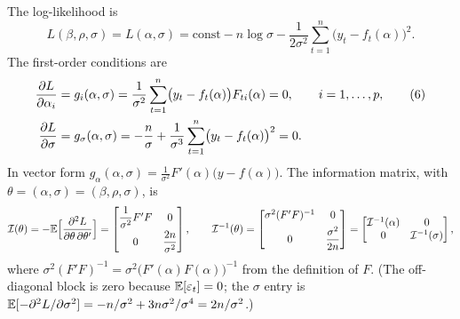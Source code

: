 \documentclass[11pt]{article}
\begin{document}
The log-likelihood is
\[ L(\beta,\rho,\sigma)=L(\alpha,\sigma)=\text{const}-n\log\sigma-\frac1{2\sigma^{2}}\sum_{t=1}^{n}\bigl(y_{t}-f_{t}(\alpha)\bigr)^{2}. \]
The first-order conditions are
\begin{align}
 \frac{\partial L}{\partial\alpha_{i}}&=g_{i}(\alpha,\sigma)=\frac1{\sigma^{2}}\sum_{t=1}^{n}\bigl(y_{t}-f_{t}(\alpha)\bigr)F_{ti}(\alpha)=0,\qquad i=1,\dots,p, \tag{6}\\
 \frac{\partial L}{\partial\sigma}&=g_{\sigma}(\alpha,\sigma)=-\frac n\sigma+\frac1{\sigma^{3}}\sum_{t=1}^{n}\bigl(y_{t}-f_{t}(\alpha)\bigr)^{2}=0. \notag
\end{align}
In vector form $g_{\alpha}(\alpha,\sigma)=\frac1{\sigma^{2}}F'(\alpha)\bigl(y-f(\alpha)\bigr)$. The information matrix, with
$\theta=(\alpha,\sigma)=(\beta,\rho,\sigma)$, is
\[ \mathcal I(\theta)=-\mathbb{E}\Bigl[\frac{\partial^{2}L}{\partial\theta\,\partial\theta'}\Bigr]
   =\begin{bmatrix}\dfrac1{\sigma^{2}}F'F&0\\[6pt]0&\dfrac{2n}{\sigma^{2}}\end{bmatrix},
   \qquad
   \mathcal I^{-1}(\theta)=\begin{bmatrix}\sigma^{2}(F'F)^{-1}&0\\[4pt]0&\dfrac{\sigma^{2}}{2n}\end{bmatrix}
   =\begin{bmatrix}\mathcal I^{-1}(\alpha)&0\\0&\mathcal I^{-1}(\sigma)\end{bmatrix}, \]
where $\sigma^{2}(F'F)^{-1}=\sigma^{2}\bigl(F'(\alpha)F(\alpha)\bigr)^{-1}$ from the definition of $F$. (The
off-diagonal block is zero because $\mathbb{E}[\varepsilon_{t}]=0$; the $\sigma$ entry is
$\mathbb{E}[-\partial^{2}L/\partial\sigma^{2}]=-n/\sigma^{2}+3n\sigma^{2}/\sigma^{4}=2n/\sigma^{2}$.)
\end{document}
